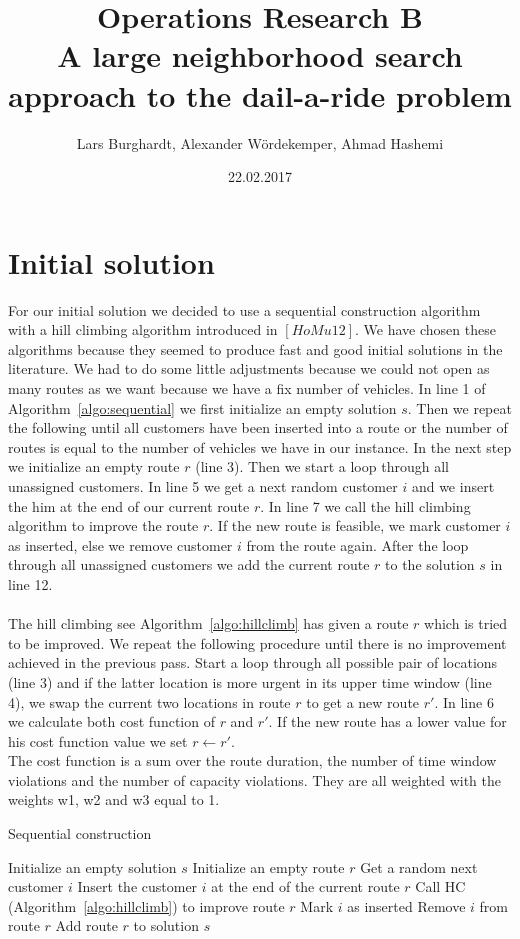 \documentclass[fleqn]{scrartcl}
\title{Operations Research B\\A large neighborhood search approach to the dail-a-ride problem}
\author{Lars Burghardt, Alexander Wördekemper, Ahmad Hashemi}
\date{22.02.2017}
\begin{document}
\maketitle
\tableofcontents
\newpage
\section{Initial solution}

For our initial solution we decided to use a sequential construction algorithm with a hill climbing algorithm introduced in $[HoMu 12]$. We have chosen these algorithms because they seemed to produce fast and good initial solutions in the literature. We had to do some little adjustments because we could not open as many routes as we want because we have a fix number of vehicles. In line 1 of Algorithm~\ref{algo:sequential} we first initialize an empty solution $s$. Then we repeat the following until all customers have been inserted into a route or the number of routes is equal to the number of vehicles we have in our instance. In the next step we initialize an empty route $r$ (line 3). Then we start a loop through all unassigned customers. In line 5 we get a next random customer $i$ and we insert the him at the end of our current route $r$. In line 7 we call the hill climbing algorithm to improve the route $r$. If the new route is feasible, we mark customer $i$ as inserted, else we remove customer $i$ from the route again. After the loop through all unassigned customers we add the current route $r$ to the solution $s$ in line 12.
\\
\\  
The hill climbing see Algorithm~\ref{algo:hillclimb} has given a route $r$ which is tried to be improved. We repeat the following procedure until there is no improvement achieved in the previous pass. Start a loop through all possible pair of locations (line 3) and if the latter location is more urgent in its upper time window (line 4), we swap the current two locations in route $r$ to get a new route $r'$. In line 6 we calculate both cost function of $r$ and $r'$. If the new route has a lower value for his cost function value we set $r\gets r'$.\\
The cost function is a sum over the route duration, the number of time window violations and the number of capacity violations. They are all weighted with the weights w1, w2 and w3 equal to 1.

\begin{algorithm}
\caption{Sequential construction}
\label{algo:sequential}
\begin{algorithmic}[1]
\State Initialize an empty solution $s$
\Repeat
\State Initialize an empty route $r$
\State Get a random next customer $i$
\State Insert the customer $i$ at the end of the current route $r$
\State Call HC (Algorithm~\ref{algo:hillclimb}) to improve route $r$
\State Mark $i$ as inserted
\Else
\State Remove $i$ from route $r$
\EndIf
\EndFor
\State Add route $r$ to solution $s$
\end{algorithmic}
\end{algorithm}
\end{document}
